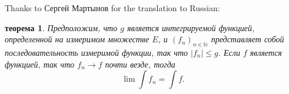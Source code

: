 \documentclass{article}
\newtheorem{theoremr}[theorem]{теорема}
\begin{document}
Thanks to Сергей Мартынов for the translation to Russian:
\begin{theoremr}
Предположим, что $g$ является
интегрируемой функцией, определенной на измеримом множестве $E$, и
$(f_n)_{n\in\mathbb N}$ представляет собой последовательность измеримой функции, так что
   $|f_n|\leq g$. Если $f$ является функцией, так что $f_n\to f$ почти везде,
   тогда
$$\lim \int f_n =\int f.$$
\end{theoremr}
\end{document}
